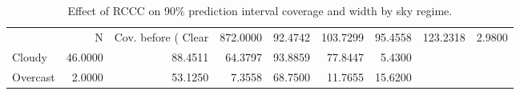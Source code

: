 \begin{table}[ht]
\centering
\caption{Effect of RCCC on 90\% prediction interval coverage and width by sky regime.}
\label{tab:rccc}
\begin{tabular}{lrrrrrr}
\toprule
 & N & Cov. before (%
\midrule
Clear & 872.0000 & 92.4742 & 103.7299 & 95.4558 & 123.2318 & 2.9800 \\
Cloudy & 46.0000 & 88.4511 & 64.3797 & 93.8859 & 77.8447 & 5.4300 \\
Overcast & 2.0000 & 53.1250 & 7.3558 & 68.7500 & 11.7655 & 15.6200 \\
\bottomrule
\end{tabular}
\end{table}